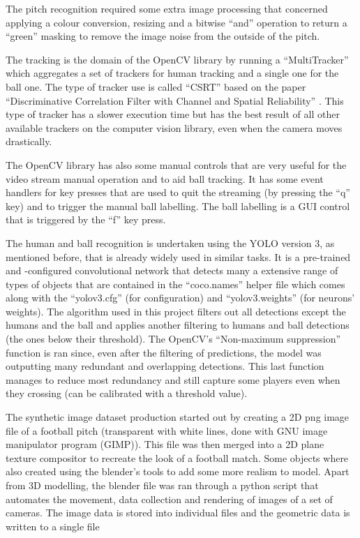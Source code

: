 \documentclass[
    11pt,
    oneside
]{report}
\begin{document}
The pitch recognition required some extra image processing that concerned applying a colour conversion, resizing and a bitwise ``and'' operation to return a ``green'' masking to remove the image noise from the outside of the pitch.


The tracking is the domain of the OpenCV library by running a ``MultiTracker'' which aggregates a set of trackers for human tracking and a single one for the ball one. The type of tracker use is called ``CSRT'' based on the paper ``Discriminative Correlation Filter with Channel and Spatial Reliability'' \cite{csrt}. This type of tracker has a slower execution time but has the best result of all other available trackers on the computer vision library, even when the camera moves drastically.


The OpenCV library has also some manual controls that are very useful for the video stream manual operation and to aid ball tracking. It has some event handlers for key presses that are used to quit the streaming (by pressing the ``q'' key) and to trigger the manual ball labelling. The ball labelling is a GUI control that is triggered by the ``f'' key press.


The human and ball recognition is undertaken using the YOLO version 3, as mentioned before, that is already widely used in similar tasks. It is a pre-trained and -configured convolutional network that detects many a extensive range of types of objects that are contained in the ``coco.names'' helper file which comes along with the ``yolov3.cfg'' (for configuration) and ``yolov3.weights'' (for neurons' weights). The algorithm used in this project filters out all detections except the humans and the ball and applies another filtering to humans and ball detections (the ones below their threshold). The OpenCV's ``Non-maximum suppression'' \cite{nms} function is ran since, even after the filtering of predictions, the model was outputting many redundant and overlapping detections. This last function manages to reduce most redundancy and still capture some players even when they crossing (can be calibrated with a threshold value).


The synthetic image dataset production started out by creating a 2D png image file of a football pitch (transparent with white lines, done with GNU image manipulator program (GIMP)). This file was then merged into a 2D plane texture compositor to recreate the look of a football match. Some objects where also created using the blender's tools to add some more realism to model. Apart from 3D modelling, the blender file was ran through a python script that automates the movement, data collection and rendering of images of a set of cameras. The image data is stored into individual files and the geometric data is written to a single file
\end{document}
